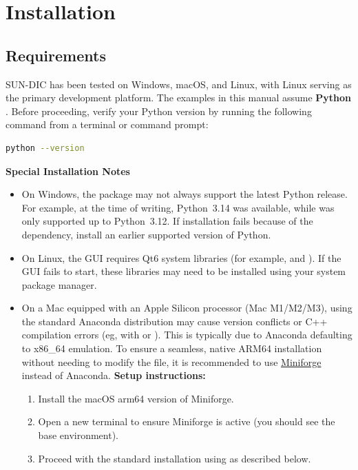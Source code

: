 \chapter{Installation}
\label{sec:installation}

\section{Requirements}

SUN-DIC has been tested on Windows, macOS, and Linux, with Linux serving as the primary development platform. The examples in this manual assume \textbf{Python \pyversion}. Before proceeding, verify your Python version by running the following command from a terminal or command prompt:

\begin{lstlisting}[language=bash]
python --version
\end{lstlisting}

\noindent
\textbf{Special Installation Notes}

\begin{itemize}
	\item On Windows, the  package may not always support the latest Python release. For example, at the time of writing, Python~3.14 was available, while  was only supported up to Python~3.12. If installation fails because of the  dependency, install an earlier supported version of Python.
	
	\item On Linux, the GUI requires Qt6 system libraries (for example,  and ). If the GUI fails to start, these libraries may need to be installed using your system package manager.
	
	\item On a Mac equipped with an Apple Silicon processor (Mac M1/M2/M3), using the standard Anaconda distribution may cause version conflicts or C++ compilation errors (eg, with  or ). This is typically due to Anaconda defaulting to x86\_64 emulation.  To ensure a seamless, native ARM64 installation without needing to modify the  file, it is recommended to use \href{https://github.com/conda-forge/miniforge}{Miniforge} instead of Anaconda. 
	\textbf{Setup instructions:}
	\begin{enumerate}
		\item Install the macOS arm64 version of Miniforge.
		\item Open a new terminal to ensure Miniforge is active (you should see the base environment).
		\item Proceed with the standard installation using  as described below.
	\end{enumerate}
\end{itemize}

